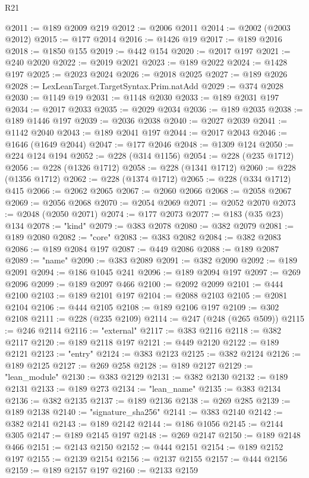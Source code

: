 \begin{lexlean}{R21}
\begin{coremodule}
@2011 := @189 @2009 @219
@2012 := @2006 @2011
@2014 := @2002 (@2003 @2012)
@2015 := @177 @2014
@2016 := @1426 @19
@2017 := @189 @2016
@2018 := @1850 @155
@2019 := @442 @154
@2020 := @2017 @197
@2021 := @240 @2020
@2022 := @2019 @2021
@2023 := @189 @2022
@2024 := @1428 @197
@2025 := @2023 @2024
@2026 := @2018 @2025
@2027 := @189 @2026
@2028 := LexLeanTarget.TargetSyntax.Prim.natAdd
@2029 := @374 @2028
@2030 := @1149 @19
@2031 := @1148 @2030
@2033 := @189 @2031 @197
@2034 := @2017 @2033
@2035 := @2029 @2034
@2036 := @189 @2035
@2038 := @189 @1446 @197
@2039 := @2036 @2038
@2040 := @2027 @2039
@2041 := @1142 @2040
@2043 := @189 @2041 @197
@2044 := @2017 @2043
@2046 := @1646 (@1649 @2044)
@2047 := @177 @2046
@2048 := @1309 @124
@2050 := @224 @124 @194
@2052 := @228 (@314 @1156)
@2054 := @228 (@235 @1712)
@2056 := @228 (@1326 @1712)
@2058 := @228 (@1341 @1712)
@2060 := @228 (@1356 @1712)
@2062 := @228 (@1374 @1712)
@2065 := @228 (@334 @1712) @415
@2066 := @2062 @2065
@2067 := @2060 @2066
@2068 := @2058 @2067
@2069 := @2056 @2068
@2070 := @2054 @2069
@2071 := @2052 @2070
@2073 := @2048 (@2050 @2071)
@2074 := @177 @2073
@2077 := @183 (@35 @23) @134
@2078 := "kind"
@2079 := @383 @2078
@2080 := @382 @2079
@2081 := @189 @2080
@2082 := "core"
@2083 := @383 @2082
@2084 := @382 @2083
@2086 := @189 @2084 @197
@2087 := @449 @2086
@2088 := @189 @2087
@2089 := "name"
@2090 := @383 @2089
@2091 := @382 @2090
@2092 := @189 @2091
@2094 := @186 @1045 @241
@2096 := @189 @2094 @197
@2097 := @269 @2096
@2099 := @189 @2097 @466
@2100 := @2092 @2099
@2101 := @444 @2100
@2103 := @189 @2101 @197
@2104 := @2088 @2103
@2105 := @2081 @2104
@2106 := @444 @2105
@2108 := @189 @2106 @197
@2109 := @302 @2108
@2111 := @228 (@235 @2109)
@2114 := @247 (@248 (@265 @509))
@2115 := @246 @2114
@2116 := "external"
@2117 := @383 @2116
@2118 := @382 @2117
@2120 := @189 @2118 @197
@2121 := @449 @2120
@2122 := @189 @2121
@2123 := "entry"
@2124 := @383 @2123
@2125 := @382 @2124
@2126 := @189 @2125
@2127 := @269 @258
@2128 := @189 @2127
@2129 := "lean_module"
@2130 := @383 @2129
@2131 := @382 @2130
@2132 := @189 @2131
@2133 := @189 @273
@2134 := "lean_name"
@2135 := @383 @2134
@2136 := @382 @2135
@2137 := @189 @2136
@2138 := @269 @285
@2139 := @189 @2138
@2140 := "signature_sha256"
@2141 := @383 @2140
@2142 := @382 @2141
@2143 := @189 @2142
@2144 := @186 @1056
@2145 := @2144 @305
@2147 := @189 @2145 @197
@2148 := @269 @2147
@2150 := @189 @2148 @466
@2151 := @2143 @2150
@2152 := @444 @2151
@2154 := @189 @2152 @197
@2155 := @2139 @2154
@2156 := @2137 @2155
@2157 := @444 @2156
@2159 := @189 @2157 @197
@2160 := @2133 @2159

\end{coremodule}
\end{lexlean}
